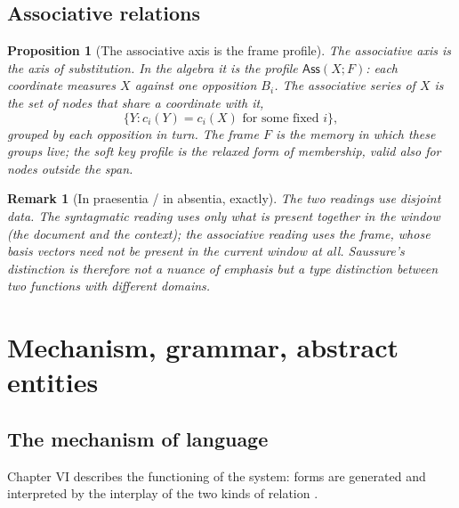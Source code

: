 \documentclass[11pt,a4paper]{article}
\newtheorem{proposition}[principle]{Proposition}
\newtheorem{remark}[principle]{Remark}
\theoremstyle{remark}
\newcommand{\Ass}{\ensuremath{\mathsf{Ass}}}             %
\begin{document}
\subsection{Associative relations}
\label{sec:associative}

\begin{proposition}[The associative axis is the frame profile]
\label{prop:associative}
The associative axis is the axis of substitution. In the algebra it is the
profile $\Ass(X; F)$: each coordinate measures $X$ against one opposition
$B_i$. The associative series of $X$ is the set of nodes that share a
coordinate with it,
\[
  \{ Y : c_i(Y) = c_i(X) \text{ for some fixed } i \},
\]
grouped by each opposition in turn. The frame $F$ is the memory in which these
groups live; the soft key profile is the relaxed form of membership, valid
also for nodes outside the span.
\end{proposition}

\begin{remark}[In praesentia / in absentia, exactly]
The two readings use disjoint data. The syntagmatic reading uses only what is
present together in the window (the document and the context); the associative
reading uses the frame, whose basis vectors need not be present in the
current window at all. Saussure's distinction is therefore not a nuance of
emphasis but a type distinction between two functions with different domains.
\end{remark}

\section{Mechanism, grammar, abstract entities}
\label{sec:mechanism}

\subsection{The mechanism of language}
\label{sec:mechanism-lang}

Chapter VI describes the functioning of the system: forms are generated and
interpreted by the interplay of the two kinds of relation
\cite[Part II, ch.~VI]{harris1983}.
\end{document}
